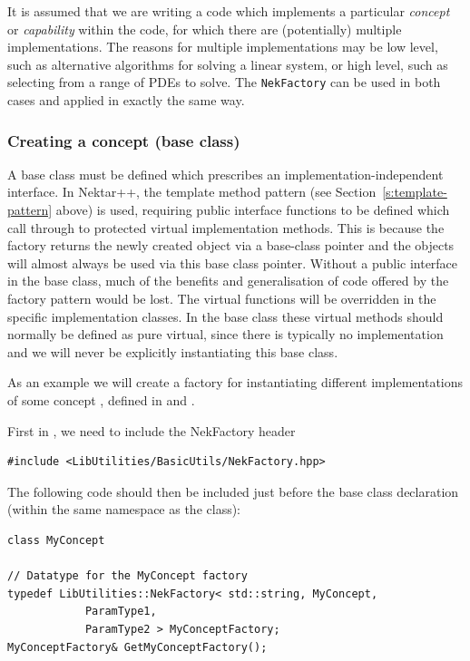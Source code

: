 It is assumed that we are writing a code which implements a particular \emph{concept} or
\emph{capability} within the code, for which there are (potentially) multiple implementations. The
reasons for multiple implementations may be low level, such as alternative
algorithms for solving a linear system, or high level, such as selecting from a
range of PDEs to solve. The \lstinline{NekFactory} can be used in both cases and applied in exactly the same way.

\subsubsection{Creating a concept (base class)}
A base class must be defined which prescribes an implementation-independent
interface. In Nektar++, the template method pattern (see Section~\ref{s:template-pattern} above) is used, requiring public
interface functions to be defined which call through to protected virtual implementation methods. This is because the factory returns the newly created object via a base-class pointer and the objects will almost always be used via this base class pointer. Without a public interface in the base class, much of the benefits and generalisation of code offered by the factory pattern would be lost.
The virtual functions will be overridden in the specific implementation classes.
In the base class these virtual methods should normally be defined as pure virtual, since there is typically no implementation and we will never be explicitly instantiating this base class.

As an example we will create a factory for instantiating different
implementations of some concept , defined in
 and .

First in , we need to include the NekFactory header
\begin{lstlisting}
#include <LibUtilities/BasicUtils/NekFactory.hpp>
\end{lstlisting}

The following code should then be included just before the base class
declaration (within the same namespace as the class):
\begin{lstlisting}
class MyConcept

// Datatype for the MyConcept factory
typedef LibUtilities::NekFactory< std::string, MyConcept, 
            ParamType1,
            ParamType2 > MyConceptFactory;
MyConceptFactory& GetMyConceptFactory();
\end{lstlisting}

